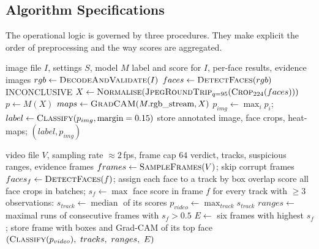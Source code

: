 \subsection{Algorithm Specifications}
The operational logic is governed by three procedures. They make explicit the order of preprocessing and the way scores are aggregated.

\begin{algorithm}[ht]
\caption{Image analysis}
\label{alg:image}
\begin{algorithmic}[1]
\Require image file $I$, settings $S$, model $M$
\Ensure label and score for $I$, per-face results, evidence images
\State $rgb \gets \textsc{DecodeAndValidate}(I)$ 
\State $faces \gets \textsc{DetectFaces}(rgb)$ 
 \State \Return INCONCLUSIVE  \EndIf
\State $X \gets \textsc{Normalise}(\textsc{JpegRoundTrip}_{q=95}(\textsc{Crop}_{224}(faces)))$
\State $p \gets M(X)$ 
\State $maps \gets \textsc{GradCAM}(M.\text{rgb\_stream},X)$ 
\State $p_{img} \gets \max_i p_i$; \; $label \gets \textsc{Classify}(p_{img},\text{margin}=0.15)$
\State store annotated image, face crops, heat-maps; \Return $(label,p_{img})$
\end{algorithmic}
\end{algorithm}

\begin{algorithm}[ht]
\caption{Video analysis (background job)}
\label{alg:video}
\begin{algorithmic}[1]
\Require video file $V$, sampling rate $\approx2$\,fps, frame cap $64$
\Ensure verdict, tracks, suspicious ranges, evidence frames
\State $frames \gets \textsc{SampleFrames}(V)$; skip corrupt frames
  \State $faces_f \gets \textsc{DetectFaces}(f)$; assign each face to a track by box overlap
\EndFor
\State score all face crops in batches; $s_f \gets \max$ face score in frame $f$
\State for every track with $\ge3$ observations: $s_{track} \gets \operatorname{median}$ of its scores
\State $p_{video} \gets \max_{track} s_{track}$ 
\State $ranges \gets$ maximal runs of consecutive frames with $s_f>0.5$
\State $E \gets$ six frames with highest $s_f$; store frame with boxes and Grad-CAM of its top face
\State \Return $(\textsc{Classify}(p_{video}),\ tracks,\ ranges,\ E)$
\end{algorithmic}
\end{algorithm}

